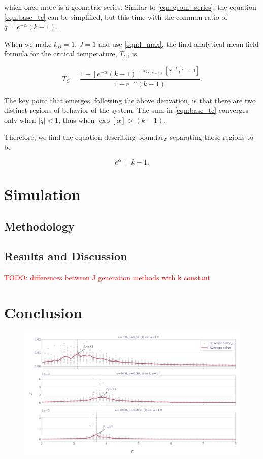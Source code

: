 \documentclass[11pt,a4paper]{article}
\newcommand{\todo}[1]{\textcolor{red}{TODO: #1}}
\begin{document}
which once more is a geometric series. Similar to \eqref{eqn:geom_series}, the equation \eqref{eqn:base_tc} can be simplified, but this time with the common ratio of $q=e^{-\alpha}(k-1)$.

When we make $k_B=1$, $J=1$ and use \eqref{eqn:l_max}, the final analytical mean-field formula for the critical temperature, $T_C$, is

\begin{equation}
    T_C = \frac{1 - [e^{-\alpha}(k-1)]^{\log_{(k-1)}{\left[N\frac{(k-2)}{k} + 1\right]}}}{1 - e^{-\alpha}(k-1)}.
\end{equation}

The key point that emerges, following the above derivation, is that there are two distinct regions of behavior of the system. The sum in \eqref{eqn:base_tc} converges only when $|q|<1$, thus when $\exp[\alpha] > (k-1)$.

Therefore, we find the equation describing boundary separating those regions to be

\begin{equation}
    e^\alpha = k-1.
\end{equation}

\section{Simulation}

\subsection{Methodology}

\subsection{Results and Discussion}

\todo{differences between J generation methods with k constant}

\section{Conclusion}

\begin{figure}[ht!]
    \includegraphics[width=\linewidth]{../figures/suscept_ER_nearest.pdf}
\end{figure}
\end{document}
